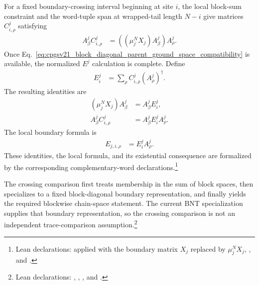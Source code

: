 \documentclass{article}
\begin{document}
For a fixed boundary-crossing interval beginning at site $i$, the local
block-sum constraint and the word-tuple span at wrapped-tail length $N-i$ give
matrices $C^j_{i,\rho}$ satisfying
\begin{align}
  A^j_\beta C^j_{i,\rho}
    &=
    ((\mu_j^NX_j)A^j_\beta)A^j_\rho.
  \label{eq:cpgsv21_block_diagonal_parent_ground_space_compatibility}
\end{align}
Once
Eq.~\ref{eq:cpgsv21_block_diagonal_parent_ground_space_compatibility} is
available, the normalized $E^j$ calculation is complete. Define
\begin{align}
  E^j_i
    &=
    \sum_\rho C^j_{i,\rho}(A^j_\rho)^\dagger.
  \label{eq:cpgsv21_block_diagonal_parent_ground_space_crossing_e}
\end{align}
The resulting identities are
\begin{align}
  (\mu_j^NX_j)A^j_\beta
    &=
    A^j_\beta E^j_i,
  \label{eq:cpgsv21_block_diagonal_parent_ground_space_crossing_intertwiner}\\
  A^j_\beta C^j_{i,\rho}
    &=
    A^j_\beta E^j_iA^j_\rho.
  \label{eq:cpgsv21_block_diagonal_parent_ground_space_crossing_factorization}
\end{align}
The local boundary formula is
\begin{align}
  E_{j,i,\rho}
    &=
    E^j_iA^j_\rho.
  \label{eq:cpgsv21_block_diagonal_parent_ground_space_local_boundary_formula}
\end{align}
These identities, the local formula, and its existential consequence are
formalized by the corresponding complementary-word declarations.\footnote{Lean
declarations:
applied with the boundary matrix \(X_j\) replaced by \(\mu_j^NX_j\),
,
and
.}

The crossing comparison first treats membership in the sum of block spaces,
then specializes to a fixed block-diagonal boundary representation, and
finally yields the required blockwise chain-space statement. The current BNT
specialization supplies that boundary representation, so the crossing
comparison is not an independent trace-comparison assumption.\footnote{Lean
declarations:
,
,
,
and
.}
\end{document}
